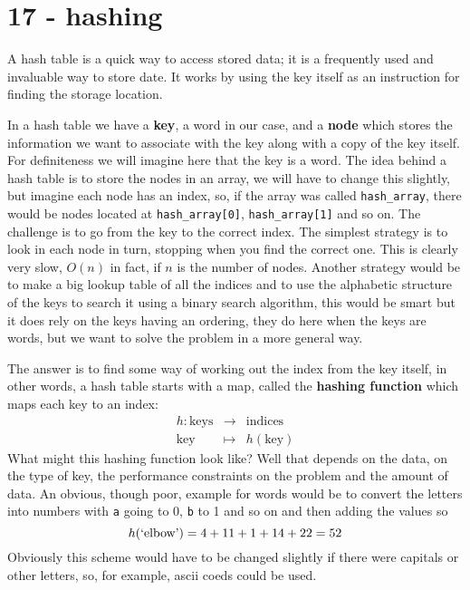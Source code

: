 \documentclass[11pt,a4paper]{scrartcl}
\begin{document}
\section*{17 - hashing}

A hash table is a quick way to access stored data; it is a frequently
used and invaluable way to store date. It works by using the key
itself as an instruction for finding the storage location.

In a hash table we have a \textbf{key}, a word in our case, and a
\textbf{node} which stores the information we want to associate with
the key along with a copy of the key itself. For definiteness we will
imagine here that the key is a word. The idea behind a hash table is
to store the nodes in an array, we will have to change this slightly,
but imagine each node has an index, so, if the array was called
\texttt{hash\_array}, there would be nodes located at
\texttt{hash\_array[0]}, \texttt{hash\_array[1]} and so on. The
challenge is to go from the key to the correct index. The simplest
strategy is to look in each node in turn, stopping when you find the
correct one. This is clearly very slow, $O(n)$ in fact, if $n$ is the
number of nodes. Another strategy would be to make a big lookup table
of all the indices and to use the alphabetic structure of the keys to
search it using a binary search algorithm, this would be smart but it
does rely on the keys having an ordering, they do here when the keys
are words, but we want to solve the problem in a more general way.

The answer is to find some way of working out the index from the key
itself, in other words, a hash table starts with a map, called the
\textbf{hashing function} which maps each key to an index:
\begin{eqnarray}
h:\mbox{keys}&\rightarrow&\mbox{indices}\\
\mbox{key}&\mapsto&h(\mbox{key})
\end{eqnarray}
What might this hashing function look like? Well that depends on the
data, on the type of key, the performance constraints on the problem
and the amount of data. An obvious, though poor, example for words
would be to convert the letters into numbers with \texttt{a} going to
0, \texttt{b} to 1 and so on and then adding the values so
\begin{equation}
h(\mbox{\lq{}elbow\rq{}})=4+11+1+14+22=52
\end{equation}
Obviously this scheme would have to be changed slightly if there were
capitals or other letters, so, for example, ascii coeds could be used.
\end{document}
